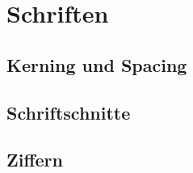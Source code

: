 \chapter{Schriften}
\label{ch:Schriften}

\section{Kerning und Spacing}
\label{sec:KernSpace}


\section{Schriftschnitte}
\label{sec:Schnitte}

\section{Ziffern}
\label{sec:Ziffern}


